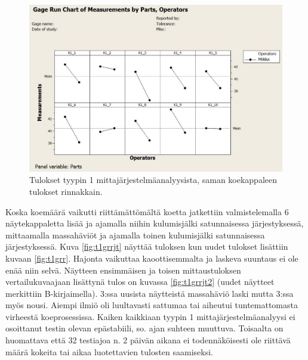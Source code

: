 \documentclass[12pt,a4paper,finnish]{tutthesis}
\begin{document}
\begin{figure}
  \begin{center}
    \includegraphics[width=1.0\textwidth]{t1grr2}
  \end{center}
  \caption[Rinnakkaiset tulokset tyypin 1 mittajärjestelmäanalyysista]{Tulokset tyypin 1 mittajärjestelmäanalyysista, saman koekappaleen tulokset rinnakkain.}
  \label{fig:t1grr2}
\end{figure}


Koska koemäärä vaikutti riittämättömältä koetta jatkettiin valmistelemalla 6 näytekappaletta lisää ja ajamalla niihin kulumisjälki satunnaisessa järjestyksessä, mittaamalla massahäviöt ja ajamalla toinen kulumisjälki satunnaisessa järjestyksessä.
Kuva \ref{fig:t1grrjt} näyttää tuloksen kun uudet tulokset lisättiin kuvaan \ref{fig:t1grr}.
Hajonta vaikuttaa kaoottisemmalta ja laskeva suuntaus ei ole enää niin selvä. Näytteen ensimmäisen ja toisen mittaustuloksen vertailukuvaajaan lisättynä
tulos on kuvassa \ref{fig:t1grrjt2} (uudet näytteet merkittiin B-kirjaimella). 3:ssa uusista näytteistä massahäviö laski mutta 3:ssa myös nousi.
Aiempi ilmiö oli luultavasti sattumaa tai aiheutui tuntemattomasta virheestä koeprosessissa. Kaiken kaikkiaan tyypin 1 mittajärjestelmäanalyysi ei osoittanut testin olevan epästabiili, so. ajan suhteen muuttuva. Toisaalta on huomattava että 32 testiajoa n. 2 päivän aikana ei todennäköisesti ole riittävä määrä kokeita tai aikaa luotettavien tulosten saamiseksi.
\end{document}
